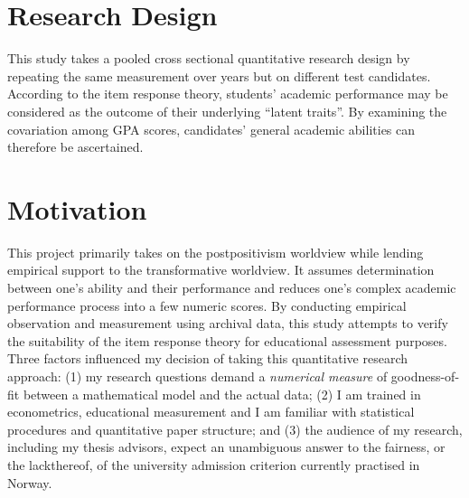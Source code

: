 \documentclass[
    a4paper,            %
    11pt,               %
    stu,                %
    donotrepeattitle,   %
    noextraspace,       %
    floatsintext,       %
    biblatex,           %
    colorlinks=true,        %
    linkcolor=red,          %
    anchorcolor=black,      %
    citecolor=blue,         %
    urlcolor=blue,          %
    bookmarks=true,         %
    bookmarksopen=false,    %
    bookmarksnumbered=true  %
]{apa7}
\begin{document}
\section{Research Design}

This study takes a pooled cross sectional quantitative research design by repeating the same measurement over years but on different test candidates. According to the item response theory, students' academic performance may be considered as the outcome of their underlying ``latent traits''. By examining the covariation among GPA scores, candidates' general academic abilities can therefore be ascertained.

\section{Motivation}

This project primarily takes on the postpositivism worldview while lending empirical support to the transformative worldview. It assumes determination between one's ability and their performance and reduces one's complex academic performance process into a few numeric scores. By conducting empirical observation and measurement using archival data, this study attempts to verify the suitability of the item response theory for educational assessment purposes. Three factors influenced my decision of taking this quantitative research approach: (1) my research questions demand a \emph{numerical measure} of goodness-of-fit between a mathematical model and the actual data; (2) I am trained in econometrics, educational measurement and I am familiar with statistical procedures and quantitative paper structure; and (3) the audience of my research, including my thesis advisors, expect an unambiguous answer to the fairness, or the lackthereof, of the university admission criterion currently practised in Norway.

\printbibliography
\end{document}
